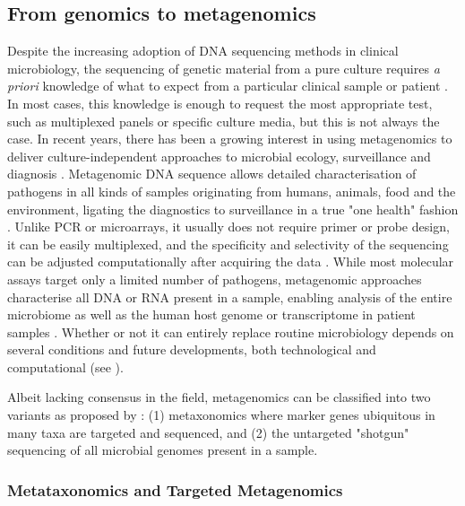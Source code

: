 \subsection{From genomics to metagenomics} \label{ssec:metagenomics}

Despite the increasing adoption of DNA sequencing methods in clinical microbiology, the sequencing of genetic material from a pure culture requires \textit{a priori} knowledge of what to expect from a particular clinical sample or patient \citep{schuele_future_2021}. 
In most cases, this knowledge is enough to request the most appropriate test, such as multiplexed panels or specific culture media, but this is not always the case. 
In recent years, there has been a growing interest in using metagenomics to deliver culture-independent approaches to microbial ecology, surveillance and diagnosis \citep{loman_twenty_2015, loman_high-throughput_2012}.
Metagenomic DNA sequence allows detailed characterisation of pathogens in all kinds of samples originating from humans, animals, food and the environment, ligating the diagnostics to surveillance in a true "one health" fashion \citep{rossen__2018}. 
Unlike PCR or microarrays, it usually does not require primer or probe design, it can be easily multiplexed, and the specificity and selectivity of the sequencing can be adjusted computationally after acquiring the data \citep{dunne_next-generation_2012}.  
While most molecular assays target only a limited number of pathogens, metagenomic approaches characterise all DNA or RNA present in a sample, enabling analysis of the entire microbiome as well as the human host genome or transcriptome in patient samples \citep{chiu_clinical_2019}. 
Whether or not it can entirely replace routine microbiology depends on several conditions and future developments, both technological and computational (see ).

Albeit lacking consensus in the field, metagenomics can be classified into two variants as proposed by \citep{marchesi_vocabulary_2015}: (1) metaxonomics where marker genes ubiquitous in many taxa are targeted and sequenced, and (2) the untargeted "shotgun" sequencing of all microbial genomes present in a sample. 

\subsubsection{Metataxonomics and Targeted Metagenomics} \label{sssec:metataxonomics}

